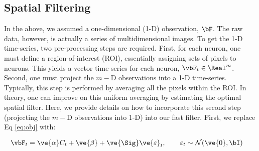 \documentclass[12pt]{article}
\begin{document}

\subsection{Spatial Filtering}

In the above, we assumed a one-dimensional (1-D) observation, $\bF$.  The raw data, however, is actually a series of multidimensional images. To get the 1-D time-series, two pre-processing steps are required.  First, for each neuron, one must define a region-of-interest (ROI), essentially assigning sets of pixels to neurons. This yields a vector time-series for each neuron, $\vbF_t \in \Real^m$.   Second, one must project the $m-$D observations into a 1-D time-series.  Typically, this step is performed by averaging all the pixels within the ROI.  In theory, one can improve on this uniform averaging by estimating the optimal spatial filter. Here, we provide details on how to incorporate this second step (projecting the $m-$D observations into 1-D) into our fast filter. First, we replace Eq \eqref{eq:obj} with:

\begin{align}
\vbF_t &= \ve{\alpha} C_t + \ve{\beta} +  \ve{\Sig} \ve{\varepsilon}_t, \qquad \varepsilon_t \sim \mathcal{N}(\ve{0},\bI) \label{eq:Obs} 
\end{align}
\end{document}
